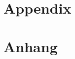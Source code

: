 \cleardoublepage
\ifdocenglish
    \chapter{Appendix}
\else
    \chapter{Anhang}
\fi
\label{app:AnahngB}


